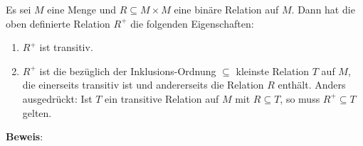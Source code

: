 \begin{Satz}
Es sei $M$ eine Menge und $R \subseteq M \times M$ eine bin\"{a}re Relation auf $M$.
Dann hat die oben definierte Relation $R^+$ die folgenden Eigenschaften:
\begin{enumerate}
\item $R^+$ ist transitiv.
\item $R^+$   ist die bez\"{u}glich der Inklusions-Ordnung $\subseteq$ kleinste Relation
      $T$ auf $M$, die einerseits transitiv ist und andererseits die Relation $R$ enth\"{a}lt.
      Anders ausgedr\"{u}ckt: Ist $T$ ein transitive Relation auf $M$ mit $R \subseteq T$, so
      muss $R^+ \subseteq T$ gelten.
\end{enumerate}
\end{Satz}

\noindent
\textbf{Beweis}:
